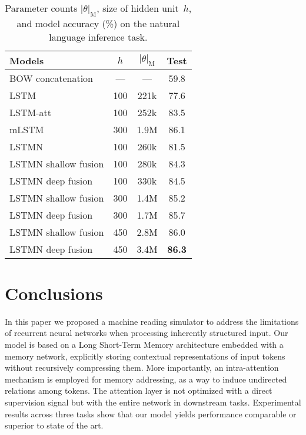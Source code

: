 \documentclass[11pt,letterpaper]{article}
\begin{document}
	\begin{table}[t]
		\centering
\begin{tabular}{|@{~}l c  c  c@{~}|}
			\hline
			Models & $h$ & $|\theta|_{\text{M}}$ & Test \\\hline
			\hline
			 BOW concatenation & --- &   ---  & 59.8 \\
			\hline
			LSTM {\scriptsize  \cite{bowman2015large}}  & 100 &  221k  & 77.6 \\
			LSTM-att {\scriptsize \cite{rocktaschel2015reasoning}} & 100 & 252k &  83.5 \\
			 mLSTM {\scriptsize \cite{wang2015learning}} & 300 & 1.9M &  {86.1} \\     
			\hline
			LSTMN & 100 & 260k  & 81.5 \\
			LSTMN shallow fusion & 100 & 280k  &  84.3\\
			LSTMN deep fusion & 100 & 330k  &  84.5 \\
			LSTMN shallow fusion & 300 & 1.4M  &  85.2 \\
			LSTMN deep fusion & 300 & 1.7M &  85.7 \\
			LSTMN shallow fusion & 450 & 2.8M   &  86.0\\
			LSTMN deep fusion & 450 & 3.4M & \textbf{86.3} \\
			\hline
		\end{tabular}
		\caption{Parameter counts $|\theta|_{\text{M}}$, size
                  of hidden unit~$h$, and  model accuracy (\%) 
                  on the natural language inference task.} 
		\label{entailment}
		\vspace{-2.5ex}
	\end{table}
	
	
	\section{Conclusions}
	\label{sec:conclusions}
	
	In this paper we proposed a machine reading simulator to
        address the limitations of recurrent neural networks when
        processing inherently structured input.  Our model is based on
        a Long Short-Term Memory architecture embedded with a memory
        network, explicitly storing contextual representations of
        input tokens without recursively compressing them.  More
        importantly, an intra-attention mechanism is employed for
        memory addressing, as a way to induce undirected relations
        among tokens. The attention layer is not optimized with a
        direct supervision signal but with the entire network in
        downstream tasks.  Experimental results across three tasks
        show that our model yields performance comparable or superior
        to state of the art.
	
\end{document}
